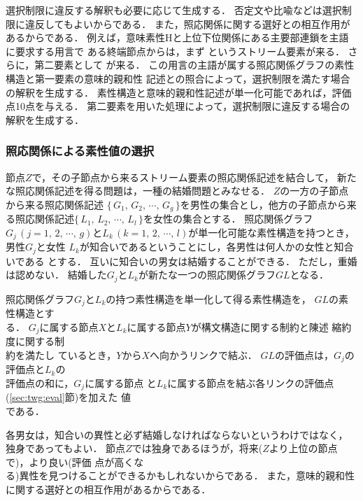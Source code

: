 選択制限に違反する解釈も必要に応じて生成する．
否定文や比喩などは選択制限に違反してもよいからである．
また，照応関係に関する選好との相互作用があるからである．
例えば，意味素性Hと上位下位関係にある主要部連鎖を主語に要求する用言で
ある終端節点からは，まず
というストリーム要素が来る．
さらに，第二要素として
が来る．
この用言の主語が属する照応関係グラフの素性構造と第一要素の意味的親和性
記述との照合によって，選択制限を満たす場合の解釈を生成する．
素性構造と意味的親和性記述が単一化可能であれば，評価点10点を与える．
第二要素を用いた処理によって，選択制限に違反する場合の解釈を生成する．

\subsubsection{照応関係による素性値の選択}
\label{sec:lazy:gen:cor}

節点$Z$で，その子節点から来るストリーム要素の照応関係記述を結合して，
新たな照応関係記述を得る問題は，一種の結婚問題とみなせる．
$Z$の一方の子節点から来る照応関係記述
$\{\,G_1,\,G_2,\,\cdots,\,G_g\,\}$を男性の集合とし，他方の子節点から来
る照応関係記述$\{\,L_1,\,L_2,\,\cdots,\,L_l\,\}$を女性の集合とする．
照応関係グラフ$G_j\,(j = 1,\,2,\,\cdots,\,g)$と$L_k\,(k =
1,\,2,\,\cdots,\,l)$が単一化可能な素性構造を持つとき，男性$G_j$と女性
$L_k$が知合いであるということにし，各男性は何人かの女性と知合いである
とする．
互いに知合いの男女は結婚することができる．
ただし，重婚は認めない．
結婚した$G_j$と$L_k$が新たな一つの照応関係グラフ$GL$となる．

照応関係グラフ$G_j$と$L_k$の持つ素性構造を単一化して得る素性構造を，
$GL$の素性構造とす\\る．
$G_j$に属する節点$X$と$L_k$に属する節点$Y$が構文構造に関する制約と陳述
縮約度に関する制\\約を満たし
ているとき，\hspace*{-0.2mm}$Y$から$X$へ向かうリンクで結ぶ．
\hspace*{-0.3mm}$GL$の評価点は，\hspace*{-0.2mm}$G_j$の評価点と$L_k$の\\評価点の和に，$G_j$に属する節点
と$L_k$に属する節点を結ぶ各リンクの評価点(\ref{sec:twg:eval}節)を加えた
値\\である．

各男女は，知合いの異性と必ず結婚しなければならないというわけではなく，
独身であってもよい． 
節点$Z$では独身であるほうが，将来($Z$より上位の節点で)，より良い(評価
点が高くな\\る)異性を見つけることができるかもしれないからである．
また，意味的親和性に関する選好との相互作用があるからである． 

